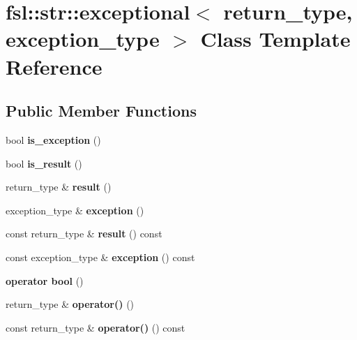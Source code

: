 \hypertarget{classfsl_1_1str_1_1exceptional}{}\section{fsl\+::str\+::exceptional$<$ return\+\_\+type, exception\+\_\+type $>$ Class Template Reference}
\label{classfsl_1_1str_1_1exceptional}
\subsection*{Public Member Functions}
\begin{DoxyCompactItemize}
\item 
\mbox{\label{classfsl_1_1str_1_1exceptional_a2573c105532d4befef180958fa49b7ea}} 
bool {\bfseries is\+\_\+exception} ()
\item 
\mbox{\label{classfsl_1_1str_1_1exceptional_a68fd60ebbea5ca43139c26bd2ae2b1be}} 
bool {\bfseries is\+\_\+result} ()
\item 
\mbox{\label{classfsl_1_1str_1_1exceptional_aed1c32d984c93d7d8acfc627e6ae159a}} 
return\+\_\+type \& {\bfseries result} ()
\item 
\mbox{\label{classfsl_1_1str_1_1exceptional_a7032c84bbeab8789aa62d9d4d20569eb}} 
exception\+\_\+type \& {\bfseries exception} ()
\item 
\mbox{\label{classfsl_1_1str_1_1exceptional_a83badaa6e445986579e8d514570493f8}} 
const return\+\_\+type \& {\bfseries result} () const
\item 
\mbox{\label{classfsl_1_1str_1_1exceptional_a01eee80746777761d5eb4d385f94b99e}} 
const exception\+\_\+type \& {\bfseries exception} () const
\item 
\mbox{\label{classfsl_1_1str_1_1exceptional_a3eb97bc532393b4e95d5861822af77c8}} 
{\bfseries operator bool} ()
\item 
\mbox{\label{classfsl_1_1str_1_1exceptional_a5062df182a7f19a184c31af49e508096}} 
return\+\_\+type \& {\bfseries operator()} ()
\item 
\mbox{\label{classfsl_1_1str_1_1exceptional_a7219bcaacb592c0e219bcf246c177345}} 
const return\+\_\+type \& {\bfseries operator()} () const
\end{DoxyCompactItemize}
